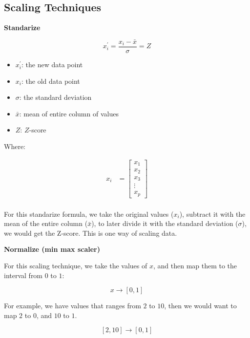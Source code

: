 \subsection{Scaling Techniques}
\begin{outline}[enumerate]
\1 \textbf{Standarize}

\[
x_i^{\prime} = \frac{x_i - \bar{x}}{\sigma} = Z
\]

\begin{itemize}
    \item $x_i^{\prime}$: the new data point  
    \item $x_i$: the old data point  
    \item $\sigma$: the standard deviation
    \item $\bar{x}$: mean of entire column of values
    \item $Z$: $Z$-score
\end{itemize}

Where:

\begin{align*}
x_i &= \begin{bmatrix}
        x_{1} \\
        x_{2} \\
        x_{3} \\
        \vdots \\
        x_{p}
        \end{bmatrix} \\
\end{align*}

For this standarize formula, we take the original values ($x_i$), subtract it with the mean of the
entire column ($\bar{x}$), to later divide it with the standard deviation ($\sigma$), we would get the
Z-score. This is one way of scaling data.


\1 \textbf{Normalize (min max scaler)}

For this scaling technique, we take the values of $x$, and then map them to the interval from $0$ to $1$:

\[
    x \rightarrow [0,1]
\] 

For example, we have values that ranges from $2$ to $10$, then we would want to map $2$ to $0$, and $10$ to $1$.

\[
    [2,10] \rightarrow [0,1]
\] 

\begin{center}
\end{center}
\end{outline}
